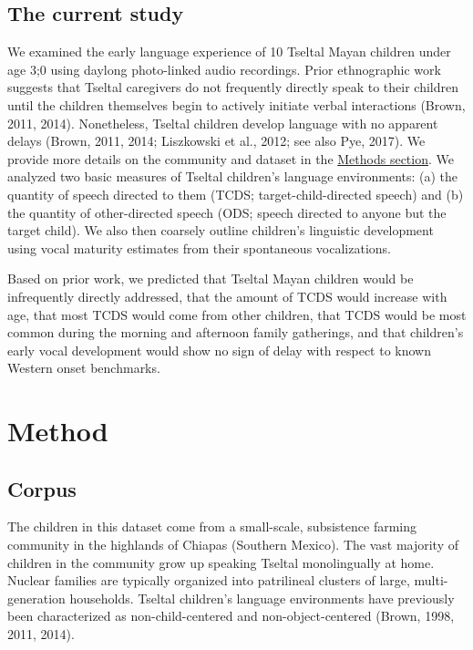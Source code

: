 \documentclass[,man,floatsintext]{apa6}
\begin{document}
\subsection{The current study}\label{intro-currentstudy}

We examined the early language experience of 10 Tseltal Mayan children
under age 3;0 using daylong photo-linked audio recordings. Prior
ethnographic work suggests that Tseltal caregivers do not frequently
directly speak to their children until the children themselves begin to
actively initiate verbal interactions (Brown, 2011, 2014). Nonetheless,
Tseltal children develop language with no apparent delays (Brown, 2011,
2014; Liszkowski et al., 2012; see also Pye, 2017). We provide more
details on the community and dataset in the
\protect\hyperlink{methods}{Methods section}. We analyzed two basic
measures of Tseltal children's language environments: (a) the quantity
of speech directed to them (TCDS; target-child-directed speech) and (b)
the quantity of other-directed speech (ODS; speech directed to anyone
but the target child). We also then coarsely outline children's
linguistic development using vocal maturity estimates from their
spontaneous vocalizations.

Based on prior work, we predicted that Tseltal Mayan children would be
infrequently directly addressed, that the amount of TCDS would increase
with age, that most TCDS would come from other children, that TCDS would
be most common during the morning and afternoon family gatherings, and
that children's early vocal development would show no sign of delay with
respect to known Western onset benchmarks.

\hypertarget{methods}{\section{Method}\label{methods}}

\subsection{Corpus}\label{methods-dataset}

The children in this dataset come from a small-scale, subsistence
farming community in the highlands of Chiapas (Southern Mexico). The
vast majority of children in the community grow up speaking Tseltal
monolingually at home. Nuclear families are typically organized into
patrilineal clusters of large, multi-generation households. Tseltal
children's language environments have previously been characterized as
non-child-centered and non-object-centered (Brown, 1998, 2011, 2014).
\end{document}
